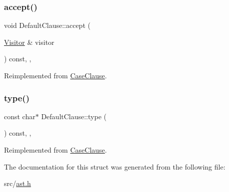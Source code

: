 \subsubsection{\texorpdfstring{accept()}{accept()}}
{\footnotesize\ttfamily void Default\+Clause\+::accept (\begin{DoxyParamCaption}\item[{\hyperlink{struct_visitor}{Visitor} \&}]{visitor }\end{DoxyParamCaption}) const\hspace{0.3cm}{\ttfamily [inline]}, {\ttfamily [override]}, {\ttfamily [virtual]}}



Reimplemented from \hyperlink{struct_case_clause_a5bbee9ea9ca206c09b8b79f8c96720a1}{Case\+Clause}.

\mbox{\label{struct_default_clause_a464358dcd7e4e13287482d3c858f3538}} 
\subsubsection{\texorpdfstring{type()}{type()}}
{\footnotesize\ttfamily const char$\ast$ Default\+Clause\+::type (\begin{DoxyParamCaption}{ }\end{DoxyParamCaption}) const\hspace{0.3cm}{\ttfamily [inline]}, {\ttfamily [override]}, {\ttfamily [virtual]}}



Reimplemented from \hyperlink{struct_case_clause_a9dcb0a1a072df7d577b272c6bbb3c6dc}{Case\+Clause}.



The documentation for this struct was generated from the following file\+:\begin{DoxyCompactItemize}
\item 
src/\hyperlink{ast_8h}{ast.\+h}\end{DoxyCompactItemize}
